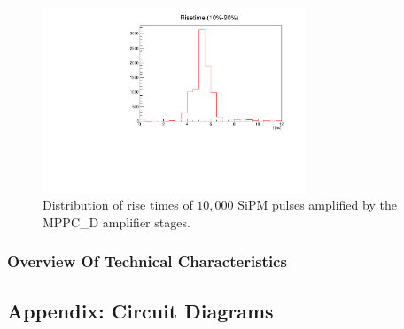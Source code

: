 	\begin{figure}[t]
		\centering
			\includegraphics[width=0.7\textwidth]{Figures/weinstock/old_amp_rise_time.pdf}
		\caption{Distribution of rise times of $10,000$ SiPM pulses amplified by the MPPC\_D amplifier stages.}
		\label{fig:rise_time_old}
	\end{figure}	

\subsubsection{Overview Of Technical Characteristics}

\subsection{Appendix: Circuit Diagrams}
